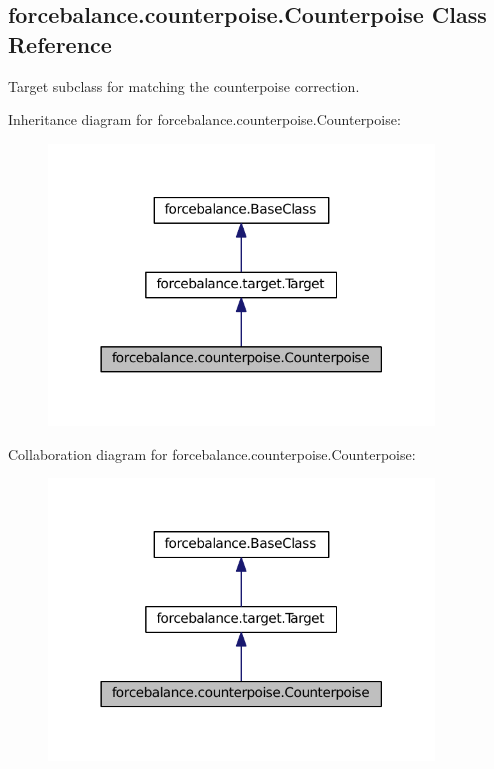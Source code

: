 \hypertarget{classforcebalance_1_1counterpoise_1_1Counterpoise}{\subsection{forcebalance.\-counterpoise.\-Counterpoise \-Class \-Reference}
\label{classforcebalance_1_1counterpoise_1_1Counterpoise}
}


\-Target subclass for matching the counterpoise correction.  




\-Inheritance diagram for forcebalance.\-counterpoise.\-Counterpoise\-:\nopagebreak
\begin{figure}[H]
\begin{center}
\leavevmode
\includegraphics[width=290pt]{classforcebalance_1_1counterpoise_1_1Counterpoise__inherit__graph}
\end{center}
\end{figure}


\-Collaboration diagram for forcebalance.\-counterpoise.\-Counterpoise\-:\nopagebreak
\begin{figure}[H]
\begin{center}
\leavevmode
\includegraphics[width=290pt]{classforcebalance_1_1counterpoise_1_1Counterpoise__coll__graph}
\end{center}
\end{figure}
